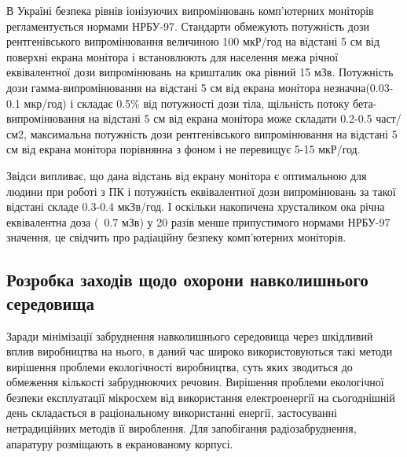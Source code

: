 В Україні безпека рівнів іонізуючих випромінювань комп'ютерних моніторів регламентується нормами НРБУ-97. Стандарти обмежують потужність дози рентгенівського випромінювання величиною 100 мкР/год на відстані 5 см від поверхні екрана монітора і встановлюють для населення межа річної еквівалентної дози випромінювань на кришталик ока рівний 15 мЗв. Потужність дози гамма-випромінювання на відстані 5 см від екрана монітора незначна(0.03-0.1 мкр/год) і складає 0.5\% від потужності дози тіла, щільність потоку бета-випромінювання на відстані 5 см від екрана монітора може складати 0.2-0.5 част/см2, максимальна потужність дози рентгенівського випромінювання на відстані 5 см від екрана монітора порівнянна з фоном і не перевищує 5-15 мкР/год. 

Звідси випливає, що дана відстань від екрану монітора є оптимальною для людини при роботі з ПК і потужність еквівалентної дози випромінювань за такої відстані складе 0.3-0.4 мкЗв/год. І оскільки накопичена хрусталиком ока річна еквівалентна доза (~0.7 мЗв) у 20 разів менше припустимого нормами НРБУ-97 значення, це свідчить про радіаційну безпеку комп'ютерних моніторів.


\subsection{Розробка заходів щодо охорони навколишнього середовища}

Заради мінімізації забруднення навколишнього середовища через шкідливий вплив виробництва на нього, в даний час широко використовуються такі методи вирішення проблеми екологічності виробництва, суть яких зводиться до обмеження кількості забруднюючих речовин. Вирішення проблеми екологічної безпеки експлуатації мікросхем від використання електроенергії на сьогоднішній день складається в раціональному використанні енергії, застосуванні нетрадиційних методів її вироблення. Для запобігання радіозабруднення, апаратуру розміщають в екранованому корпусі.
